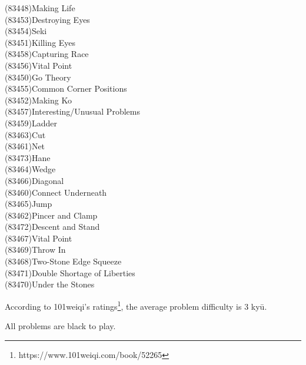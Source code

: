 (83448)\:\:Making Life\\
(83453)\:\:Destroying Eyes\\
(83454)\:\:Seki\\
(83451)\:\:Killing Eyes\\
(83458)\:\:Capturing Race\\
(83456)\:\:Vital Point\\
(83450)\:\:Go Theory\\
(83455)\:\:Common Corner Positions\\
(83452)\:\:Making Ko\\
(83457)\:\:Interesting/Unusual Problems\\
(83459)\:\:Ladder\\
(83463)\:\:Cut\\
(83461)\:\:Net\\
(83473)\:\:Hane\\
(83464)\:\:Wedge\\
(83466)\:\:Diagonal\\
(83460)\:\:Connect Underneath\\
(83465)\:\:Jump\\
(83462)\:\:Pincer and Clamp\\
(83472)\:\:Descent and Stand\\
(83467)\:\:Vital Point\\
(83469)\:\:Throw In\\
(83468)\:\:Two-Stone Edge Squeeze\\
(83471)\:\:Double Shortage of Liberties\\
(83470)\:\:Under the Stones

According to 101weiqi's ratings\footnote{https://www.101weiqi.com/book/52265}, the average problem difficulty is 3 ky\=u.

All problems are black to play.

\renderproblems
\rendersolutions


